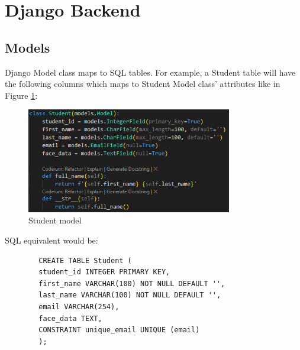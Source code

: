 \section{Django Backend}
\subsection{Models}
	Django Model class maps to SQL tables. For example, a Student table will have the following columns which maps to Student Model class' attributes like in Figure \ref{fig:models}: 
	
	\begin{figure}[h] %
		\centering
		\includegraphics[width=0.8\textwidth]{figures/chapter4/models.png} %
		\caption{Student model}
		\label{fig:models}
	\end{figure}
	
	SQL equivalent would be:
	\begin{verbatim}
		CREATE TABLE Student (
		student_id INTEGER PRIMARY KEY,
		first_name VARCHAR(100) NOT NULL DEFAULT '',
		last_name VARCHAR(100) NOT NULL DEFAULT '',
		email VARCHAR(254),
		face_data TEXT,
		CONSTRAINT unique_email UNIQUE (email)
		);
	\end{verbatim}
